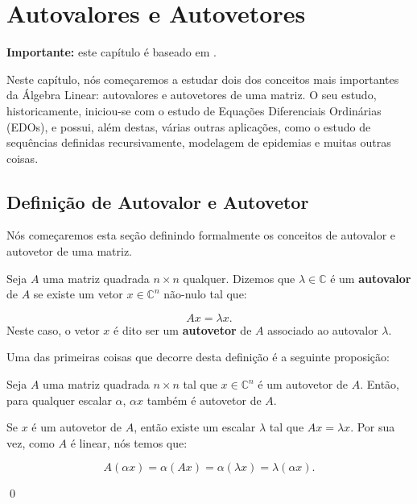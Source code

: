 \chapter{Autovalores e Autovetores}
\label{cap:autovalores-e-autovetores}

\textbf{Importante:} este capítulo é baseado em \cite{slide7doyuri}.

Neste capítulo, nós começaremos a estudar dois dos conceitos mais importantes da Álgebra Linear: autovalores e autovetores de uma matriz. O seu estudo, historicamente, iniciou-se com o estudo de Equações Diferenciais Ordinárias (EDOs), e possui, além destas, várias outras aplicações, como o estudo de sequências definidas recursivamente, modelagem de epidemias e muitas outras coisas.

\section{Definição de Autovalor e Autovetor}

Nós começaremos esta seção definindo formalmente os conceitos de autovalor e autovetor de uma matriz.

\begin{Definition}
	Seja $A$ uma matriz quadrada $n\times n$ qualquer. Dizemos que $\lambda\in\mathbb{C}$ é um \textbf{autovalor} de $A$ se existe um vetor $x\in\mathbb{C}^n$ não-nulo tal que:
	
	$$
	Ax = \lambda x.
	$$
	Neste caso, o vetor $x$ é dito ser um \textbf{autovetor} de $A$ associado ao autovalor $\lambda$.
\end{Definition}

Uma das primeiras coisas que decorre desta definição é a seguinte proposição:

\begin{Proposition}
	Seja $A$ uma matriz quadrada $n\times n$ tal que $x\in\mathbb{C}^n$ é um autovetor de $A$. Então, para qualquer escalar $\alpha$, $\alpha x$ também é autovetor de $A$. 
\end{Proposition}

\begin{Proof}
	Se $x$ é um autovetor de $A$, então existe um escalar $\lambda$ tal que $Ax = \lambda x$. Por sua vez, como $A$ é linear, nós temos que:
	
	$$
	A(\alpha x) = \alpha(Ax) = \alpha(\lambda x) = \lambda(\alpha x).
	$$
	
	\qed
\end{Proof}

